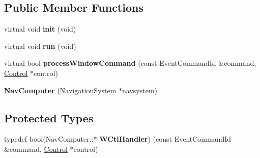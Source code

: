 \subsection*{Public Member Functions}
\begin{DoxyCompactItemize}
\item 
virtual void {\bfseries init} (void)\hypertarget{classNavComputer_ab09327086f01fc1074c2403914e74136}{}\label{classNavComputer_ab09327086f01fc1074c2403914e74136}

\item 
virtual void {\bfseries run} (void)\hypertarget{classNavComputer_aac15e7488df1bb85a2a5a59004d9ad36}{}\label{classNavComputer_aac15e7488df1bb85a2a5a59004d9ad36}

\item 
virtual bool {\bfseries process\+Window\+Command} (const Event\+Command\+Id \&command, \hyperlink{classControl}{Control} $\ast$control)\hypertarget{classNavComputer_aaad243f263d0476c298b07115c177881}{}\label{classNavComputer_aaad243f263d0476c298b07115c177881}

\item 
{\bfseries Nav\+Computer} (\hyperlink{classNavigationSystem}{Navigation\+System} $\ast$navsystem)\hypertarget{classNavComputer_a930862c42eb45d628766ef5feca3a7b7}{}\label{classNavComputer_a930862c42eb45d628766ef5feca3a7b7}

\end{DoxyCompactItemize}
\subsection*{Protected Types}
\begin{DoxyCompactItemize}
\item 
typedef bool(Nav\+Computer\+::$\ast$ {\bfseries W\+Ctl\+Handler}) (const Event\+Command\+Id \&command, \hyperlink{classControl}{Control} $\ast$control)\hypertarget{classNavComputer_a5a9abd8c557b8d7c72d986c752b869ba}{}\label{classNavComputer_a5a9abd8c557b8d7c72d986c752b869ba}

\end{DoxyCompactItemize}
